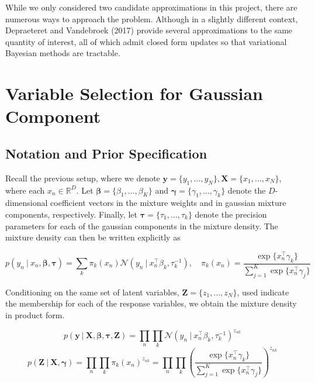 \documentclass[twoside,11pt]{article}
\newcommand\given[1][]{\:#1\vert\:}
\newcommand{\transpose}[1]{#1^{\intercal}}
\newcommand{\R}{\mathbb{R}}
\newcommand{\nprod}{\prod\limits_{n}}
\newcommand{\kprod}{\prod\limits_{k}}
\newcommand{\ksum}{\sum\limits_{k}}
\newcommand{\boldbeta}{\boldsymbol\beta}
\newcommand{\boldgamma}{\boldsymbol\gamma}
\newcommand{\boldtau}{\boldsymbol\tau}
\newcommand{\sumexp}{\sum_{j=1}^{K} \exp \{ \transpose{x_n} \gamma_j \}}
\newcommand{\pr}[1]{p \left( #1 \right)}
\begin{document}
While we only considered two candidate approximations in this project, there are numerous ways to approach the problem. Although in a slightly different context, Depraeteret and Vandebroek (2017) provide several approximations to the same quantity of interest, all of which admit closed form updates so that variational Bayesian methods are tractable. 



\newpage

\section{Variable Selection for Gaussian Component} \label{vs}  %


\subsection{Notation and Prior Specification}
Recall the previous setup, where we denote $\mathbf{y} = \{y_1, \ldots, y_N \}, \mathbf{X} = \{ x_1, \ldots, x_N \}$, where each $x_n \in \R^{D}$. Let $\boldbeta = \{ \beta_1, \ldots, \beta_K\}$ and $\boldgamma = \{ \gamma_1, \ldots, \gamma_k\}$ denote the $D$-dimensional coefficient vectors  in the mixture weights and in gaussian mixture components, respectively. Finally, let $\boldtau = \{ \tau_1, \ldots, \tau_k \}$ denote the precision parameters for each of the gaussian components in the mixture density. The mixture density can then be written explicitly as

\begin{equation} 
	 \pr{y_n \given x_n, \boldbeta, \boldtau} = \ksum \pi_k(x_n) \mathcal{N} \left( y_n \given \transpose{x_n}\beta_k, \tau_k^{-1} \right), \quad \pi_k(x_n) = \frac{\exp\{\transpose{x_n} \gamma_k\}}{\sum\limits_{j=1}^{K} \exp\{ \transpose{x_n} \gamma_j\}}
\end{equation}


Conditioning on the same set of latent variables, $\mathbf{Z} = \{ z_1, \ldots, z_N \}$, used indicate the membership for each of the response variables, we obtain the mixture density in product form. 

\begin{equation} 
	p \left( \mathbf{y} \given \mathbf{X}, \boldsymbol\beta, \boldsymbol{\tau}, \mathbf{Z} \right) = 
	\prod_{n} \prod_{k} \mathcal{N} \left( y_n \given \transpose{x_n} \beta_k, \tau_{k}^{-1} \right)^{z_{nk}}
\end{equation}
\begin{equation} 
	p \left( \mathbf{Z} \given \mathbf{X}, \boldsymbol\gamma \right) = \nprod \kprod \pi_{k} (x_n)^{z_{nk}} = 
	\nprod \kprod \left( \frac{\exp\{\transpose{x_n} \gamma_k\}}{\sumexp}\right)^{z_{nk}}
\end{equation}
\end{document}
